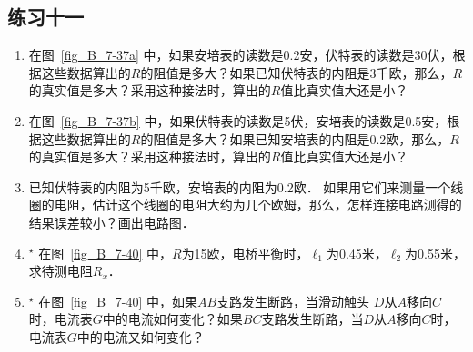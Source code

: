 \subsection*{练习十一}
\begin{enumerate}
    \item 在图~\ref{fig_B_7-37a} 中，如果安培表的读数是0.2安，伏特表的读数是30伏，根据这些数据算出的$R$的阻值是多大？如果已知伏特表的内阻是3千欧，那么，$R$的真实值是多大？采用这种接法时，算出的$R$值比真实值大还是小？
    \item 在图~\ref{fig_B_7-37b} 中，如果伏特表的读数是5伏，安培表的读数是0.5安，根据这些数据算出的$R$的阻值是多大？如果已知安培表的内阻是0.2欧，那么，$R$的真实值是多大？采用这种接法时，算出的$R$值比真实值大还是小？
    \item 已知伏特表的内阻为5千欧，安培表的内阻为0.2欧．
    如果用它们来测量一个线圈的电阻，估计这个线圈的电阻大约为几个欧姆，那么，怎样连接电路测得的结果误差较小？画出电路图．
    \item$^\star$ 在图~\ref{fig_B_7-40} 中，$R$为15欧，电桥平衡时，$\ell_1$为0.45米，$\ell_2$为0.55米，求待测电阻$R_x$．
    \item$^\star$ 在图~\ref{fig_B_7-40} 中，如果$AB$支路发生断路，当滑动触头
    $D$从$A$移向$C$时，电流表$G$中的电流如何变化？如果$BC$支路发生断路，当$D$从$A$移向$C$时，电流表$G$中的电流又如何变化？
\end{enumerate}

